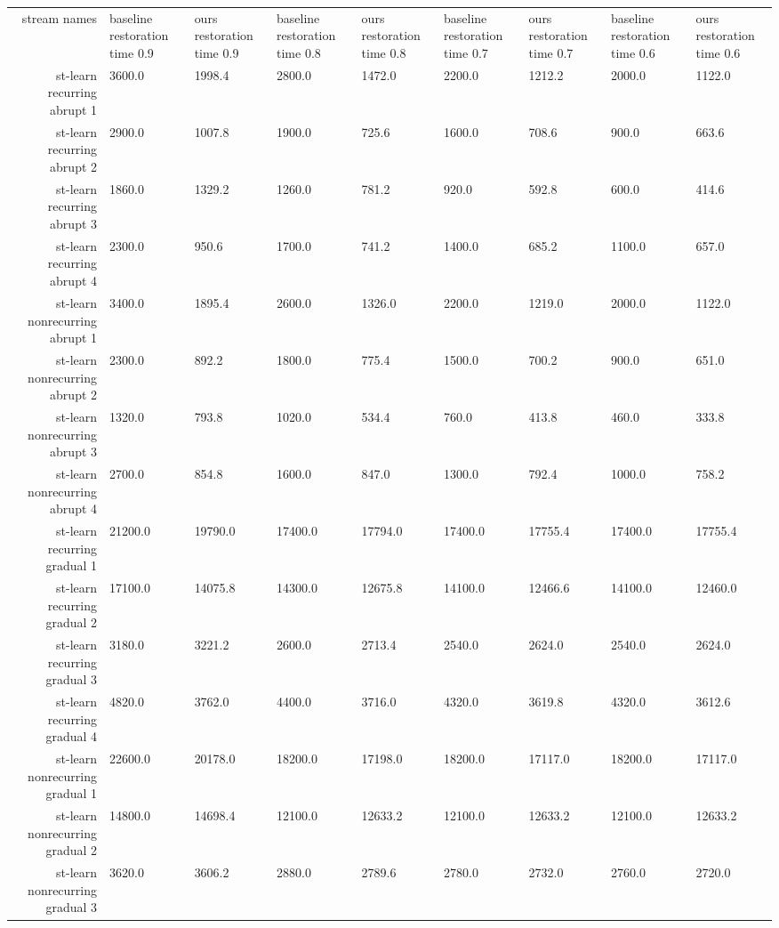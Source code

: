 \begin{tabular}{|r|l|l|l|l|l|l|l|l|}
  \hline
  stream names & baseline restoration time 0.9 & ours restoration time 0.9 & baseline restoration time 0.8 & ours restoration time 0.8 & baseline restoration time 0.7 & ours restoration time 0.7 & baseline restoration time 0.6 & ours restoration time 0.6 \\ 
  st-learn recurring abrupt 1 & 3600.0 & 1998.4 & 2800.0 & 1472.0 & 2200.0 & 1212.2 & 2000.0 & 1122.0 \\ 
  st-learn recurring abrupt 2 & 2900.0 & 1007.8 & 1900.0 & 725.6 & 1600.0 & 708.6 & 900.0 & 663.6 \\ 
  st-learn recurring abrupt 3 & 1860.0 & 1329.2 & 1260.0 & 781.2 & 920.0 & 592.8 & 600.0 & 414.6 \\ 
  st-learn recurring abrupt 4 & 2300.0 & 950.6 & 1700.0 & 741.2 & 1400.0 & 685.2 & 1100.0 & 657.0 \\ 
  st-learn nonrecurring abrupt 1 & 3400.0 & 1895.4 & 2600.0 & 1326.0 & 2200.0 & 1219.0 & 2000.0 & 1122.0 \\ 
  st-learn nonrecurring abrupt 2 & 2300.0 & 892.2 & 1800.0 & 775.4 & 1500.0 & 700.2 & 900.0 & 651.0 \\ 
  st-learn nonrecurring abrupt 3 & 1320.0 & 793.8 & 1020.0 & 534.4 & 760.0 & 413.8 & 460.0 & 333.8 \\ 
  st-learn nonrecurring abrupt 4 & 2700.0 & 854.8 & 1600.0 & 847.0 & 1300.0 & 792.4 & 1000.0 & 758.2 \\ 
  st-learn recurring gradual 1 & 21200.0 & 19790.0 & 17400.0 & 17794.0 & 17400.0 & 17755.4 & 17400.0 & 17755.4 \\ 
  st-learn recurring gradual 2 & 17100.0 & 14075.8 & 14300.0 & 12675.8 & 14100.0 & 12466.6 & 14100.0 & 12460.0 \\ 
  st-learn recurring gradual 3 & 3180.0 & 3221.2 & 2600.0 & 2713.4 & 2540.0 & 2624.0 & 2540.0 & 2624.0 \\ 
  st-learn recurring gradual 4 & 4820.0 & 3762.0 & 4400.0 & 3716.0 & 4320.0 & 3619.8 & 4320.0 & 3612.6 \\ 
  st-learn nonrecurring gradual 1 & 22600.0 & 20178.0 & 18200.0 & 17198.0 & 18200.0 & 17117.0 & 18200.0 & 17117.0 \\ 
  st-learn nonrecurring gradual 2 & 14800.0 & 14698.4 & 12100.0 & 12633.2 & 12100.0 & 12633.2 & 12100.0 & 12633.2 \\ 
  st-learn nonrecurring gradual 3 & 3620.0 & 3606.2 & 2880.0 & 2789.6 & 2780.0 & 2732.0 & 2760.0 & 2720.0 \\ 

\end{tabular}
